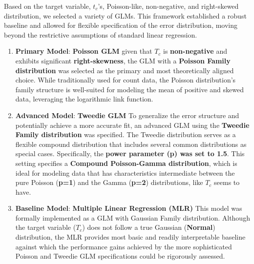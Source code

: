\documentclass[conference]{IEEEtran}
\begin{document}
Based on the target variable, $t_c$'s, Poisson-like, non-negative, and right-skewed distribution, we selected a variety of GLMs. This framework established a robust baseline and allowed for flexible specification of the error distribution, moving beyond the restrictive assumptions of standard linear regression.
\begin{enumerate}
	\item \textbf{Primary Model}: \textbf{Poisson GLM} given that $T_c$ is \textbf{ non-negative} and exhibits significant  \textbf{right-skewness}, the GLM with a \textbf{Poisson Family distribution} was selected as the primary and most theoretically aligned choice. While traditionally used for count data, the Poisson distribution's family structure is well-suited for modeling the mean of positive and skewed data, leveraging the logarithmic link function.
	\item \textbf{Advanced Model}: \textbf{Tweedie GLM} To generalize the error structure and potentially achieve a more accurate fit, an advanced GLM using the \textbf{Tweedie Family distribution} was specified. The Tweedie distribution serves as a flexible compound distribution that includes several common distributions as special cases. Specifically, the \textbf{power parameter (p) was set to 1.5}. This setting specifies a \textbf{Compound Poisson-Gamma distribution}, which is ideal for modeling data that has characteristics intermediate between the pure Poisson (\textbf{p=1}) and the Gamma (\textbf{p=2}) distributions, like $T_c$ seems to have.
	\item \textbf{Baseline Model}: \textbf{Multiple Linear Regression (MLR)} This model was formally implemented as a GLM with Gaussian Family distribution. Although the target variable ($T_c$) does not follow a true Gaussian (\textbf{Normal}) distribution, the MLR provides most basic and readily interpretable baseline against which the performance gains achieved by the more sophisticated Poisson and Tweedie GLM specifications could be rigorously assessed.\\
\end{enumerate}
\end{document}
